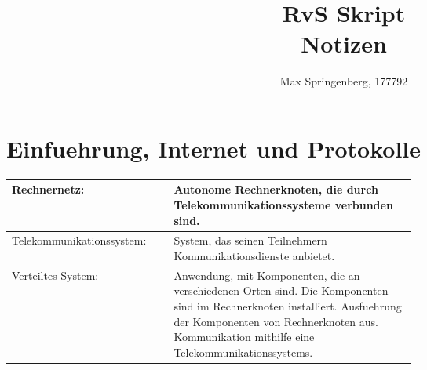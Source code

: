 \documentclass{article}
\author{Max Springenberg, 177792}
\title{
    RvS Skript\\
    Notizen
}
\date{}
\begin{document}
\maketitle

\section{Einfuehrung, Internet und Protokolle}
\begin{tabular}{|lp{0.6\linewidth}|}
    \hline
    Rechnernetz: & 
        Autonome Rechnerknoten, die durch Telekommunikationssysteme verbunden sind.\\
    \hline
    Telekommunikationssystem: &
        System, das seinen Teilnehmern Kommunikationsdienste anbietet.\\
    \hline
    Verteiltes System: &
        Anwendung, mit Komponenten, die an verschiedenen Orten sind.
        Die Komponenten sind im Rechnerknoten installiert.
        Ausfuehrung der Komponenten von Rechnerknoten aus.
        Kommunikation mithilfe eine Telekommunikationssystems.\\
    \hline
\end{tabular}
\newpage
\end{document}
